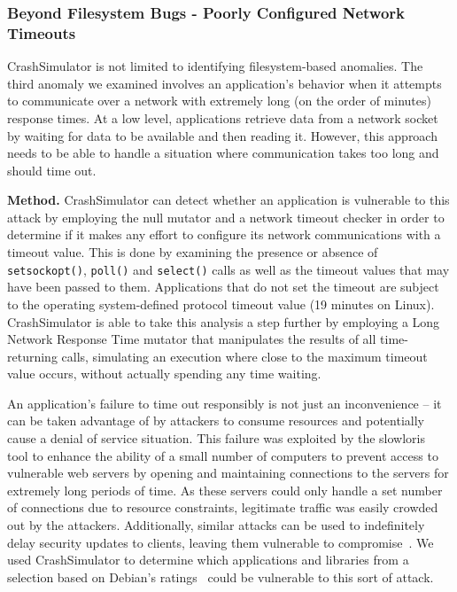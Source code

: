 \subsubsection{Beyond Filesystem Bugs - Poorly Configured Network Timeouts}
\label{sec-timeout-bugs}

CrashSimulator is not limited
to identifying filesystem-based anomalies.
The third anomaly we examined
involves an application's behavior
when it attempts to communicate
over a network with extremely long
(on the order of minutes) response times.
At a low level,
applications retrieve data from a network socket
by waiting for data to be available and then reading it.
However,
this approach needs to be able to handle
a situation where communication
takes too long and should time out.

{\bf Method.} CrashSimulator can detect
whether an application is vulnerable to this attack
by employing the null mutator and a network timeout checker
in order to determine if it makes any effort
to configure its network communications with a timeout value.
This is done
by examining the presence or absence of {\tt setsockopt()}, {\tt poll()}
and {\tt select()} calls as well as the timeout values that may
have been passed to them. Applications that do not set the timeout are
subject to the operating system-defined protocol timeout value (19 minutes
on Linux).
CrashSimulator is able to take this analysis a step further by employing a
Long Network Response Time mutator
that manipulates
the results of all time-returning calls,
simulating an execution where close
to the maximum timeout value occurs,
without actually spending any time
waiting.

An application's failure
to time out responsibly
is not just an inconvenience --
it can be taken advantage of by attackers
to consume resources and potentially cause a denial of service situation.
This failure was exploited by the slowloris~\cite{Slowloris} tool
to enhance the ability
of a small number of computers to prevent access
to vulnerable web servers
by opening and maintaining connections to the servers
for extremely long periods of time.
As these servers could only handle a set number of connections
due to resource constraints,
legitimate traffic was easily crowded out by the attackers.
Additionally, similar attacks can be used to
indefinitely delay security updates to
clients, leaving them vulnerable to compromise~\cite{Cappos_TR_08}.
We used CrashSimulator to determine which applications and
libraries from a selection based on Debian's ratings~\cite{DebPopCon}
could be vulnerable to this sort of attack.

